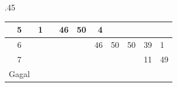 \begin{landscape}
\begin{table}
\begin{subtable}{.45\linewidth}
\begin{tabular}{|c|lllllllll|}
			5                                                                         & \multicolumn{1}{r|}{1}  & \multicolumn{1}{r|}{}   & \multicolumn{1}{r|}{46} & \multicolumn{1}{r|}{50} & \multicolumn{1}{r|}{4}  & \multicolumn{1}{r|}{}   & \multicolumn{1}{r|}{}   & \multicolumn{1}{r|}{}   &                         \\ \hline
			6                                                                         & \multicolumn{1}{r|}{}   & \multicolumn{1}{r|}{}   & \multicolumn{1}{r|}{}   & \multicolumn{1}{r|}{}   & \multicolumn{1}{r|}{46} & \multicolumn{1}{r|}{50} & \multicolumn{1}{r|}{50} & \multicolumn{1}{r|}{39} & 1                       \\ \hline
			7                                                                         & \multicolumn{1}{r|}{}   & \multicolumn{1}{r|}{}   & \multicolumn{1}{r|}{}   & \multicolumn{1}{r|}{}   & \multicolumn{1}{r|}{}   & \multicolumn{1}{r|}{}   & \multicolumn{1}{r|}{}   & \multicolumn{1}{r|}{11} & 49                      \\ \hline
			Gagal                                                                     & \multicolumn{1}{r|}{}   & \multicolumn{1}{r|}{}   & \multicolumn{1}{r|}{}   & \multicolumn{1}{r|}{}   & \multicolumn{1}{r|}{}   & \multicolumn{1}{r|}{}   & \multicolumn{1}{r|}{}   & \multicolumn{1}{r|}{}   &                         \\ \hline
			\end{tabular}
		\end{subtable}
	\end{table}
\end{landscape}

\clearpage

